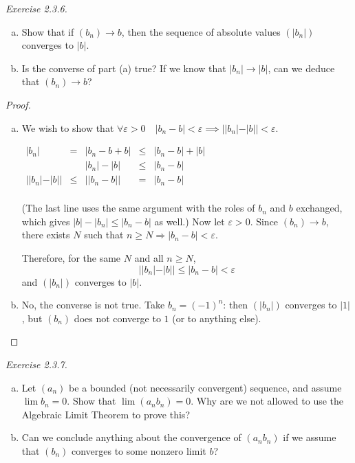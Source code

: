 \smallskip


\noindent
\emph{Exercise 2.3.6.} 
\begin{enumerate}[(a)]
\item Show that if $(b_n) \to b$, then the sequence of absolute values $(|b_n|)$ converges to $|b|$.


\item Is the converse of part (a) true? If we know that $|b_n| \to |b|$, can we deduce that $(b_n) \to b$?
\end{enumerate}

\begin{proof}
\begin{enumerate}[(a)]
\item We wish to show that $\forall \varepsilon > 0 \quad |b_n - b| < \varepsilon  \implies ||b_n| - |b|| < \varepsilon$.

$\begin{array} {rcrcl} 
|b_n|& = &|b_n - b + b|  &\leq & |b_n - b| + |b|\\ 
	&&	|b_n| - |b|	& \leq & |b_n - b|	\\
||b_n| - |b|| &\leq&    ||b_n - b|| &=& |b_n - b|\\
    \end{array}	$
    
    (The last line uses the same argument with the roles of $b_n$ and $b$ exchanged, which gives $|b| - |b_n| \leq |b_n - b|$ as well.)  Now let $\varepsilon > 0$.  Since $(b_n) \to b$, there exists $N$ such that $n \geq N \Rightarrow |b_n - b| < \varepsilon$.
    
    Therefore, for the same $N$ and all $n \geq N$,
    $$ ||b_n| - |b|| \leq     |b_n - b| < \varepsilon $$
    and $(|b_n|)$ converges to $|b|$.
    
\item No, the converse is not true.  Take $b_n = (-1)^n$: then $(|b_n|)$ converges to $|1|$, but $(b_n)$ does not converge to $1$ (or to anything else).
\end{enumerate}
\end{proof}

\smallskip


\noindent
\emph{Exercise 2.3.7.} 
\begin{enumerate}[(a)]
	\item Let $(a_n)$ be a bounded (not necessarily convergent) sequence, and assume $\lim b_n = 0$. Show that $\lim(a_n b_n ) = 0$. Why are we not allowed to use the Algebraic Limit Theorem to prove this?

\item Can we conclude anything about the convergence of $(a_n b_n)$ if we assume that $(b_n)$ converges to some nonzero limit $b$?
\end{enumerate}


